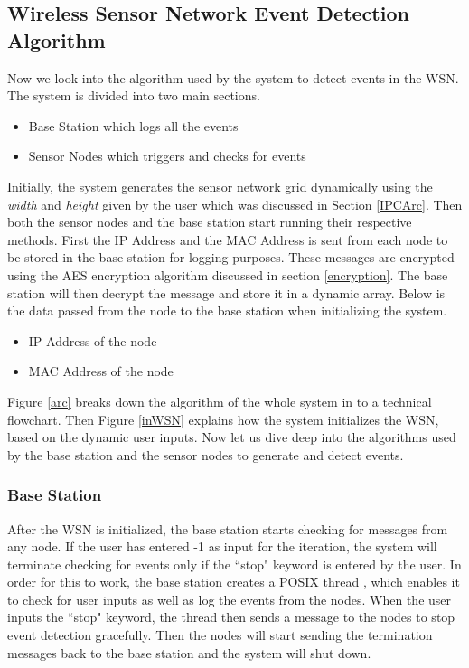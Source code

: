 \documentclass[conference]{IEEEtran}
\begin{document}
	
	\subsection{ Wireless Sensor Network Event Detection Algorithm }
	
	
	Now we look into the algorithm used by the system to detect events in the WSN. The system is divided into two main sections.
	
	\begin{itemize}
		\item Base Station which logs all the events
		\item Sensor Nodes which triggers and checks for events
	\end{itemize}

	Initially, the system generates the sensor network grid dynamically using the \emph{width} and \emph{height} given by the user which was discussed in Section \ref{IPCArc}. Then both the sensor nodes and the base station start running their respective methods. First the IP Address and the MAC Address is sent from each node to be stored in the base station for logging purposes. These messages are encrypted using the AES encryption algorithm \cite{daemen1999aes} discussed in section \ref{encryption}. The base station will then decrypt the message and store it in a dynamic array. Below is the data passed from the node to the base station when initializing the system.
	
		\begin{itemize}
		\item IP Address of the node
		\item MAC Address of the node
	\end{itemize}
	
	
	Figure \ref{arc} breaks down the algorithm of the whole system in to a technical flowchart. Then Figure \ref{inWSN} explains how the system initializes the WSN, based on the dynamic user inputs. Now let us dive deep into the algorithms used by the base station and the sensor nodes to generate and detect events. 
	
	
	\subsubsection{Base Station}
	After the WSN is initialized, the base station starts checking for messages from any node. If the user has entered -1 as input for the iteration, the system will terminate checking for events only if the ``stop" keyword is entered by the user. In order for this to work, the base station creates a POSIX thread \cite{drepper2003native}, which enables it to check for user inputs as well as log the events from the nodes. When the user inputs the ``stop" keyword, the thread then sends a message to the nodes to stop event detection gracefully. Then the nodes will start sending the termination messages back to the base station and the system will shut down.
		
\end{document}
